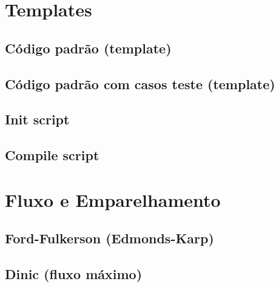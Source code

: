 \setcounter{page}{1}
\section{Templates}

\subsection{Código padrão (template)}


\subsection{Código padrão com casos teste (template)}


\subsection{Init script}


\subsection{Compile script}


\section{Fluxo e Emparelhamento}

\subsection{Ford-Fulkerson (Edmonds-Karp)}


\subsection{Dinic (fluxo máximo)}


% 

